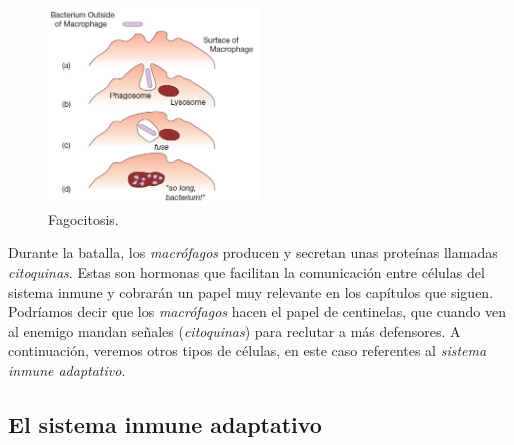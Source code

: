 \begin{figure}[t]
	\centering
	\includegraphics[width=0.5\textwidth]{1_macrofago}
	\caption{Fagocitosis.}
	\label{fig:macrofago}
\end{figure}


Durante la batalla, los \textit{macrófagos} producen y secretan unas proteínas llamadas \textit{citoquinas}.
Estas son hormonas que facilitan la comunicación entre células del sistema inmune y cobrarán un papel muy relevante en los capítulos que siguen.
Podríamos decir que los \textit{macrófagos} hacen el papel de centinelas, que cuando ven al enemigo mandan señales (\textit{citoquinas}) para reclutar a más defensores. A continuación, veremos otros tipos de células, en este caso referentes al \textit{sistema inmune adaptativo}.

\subsection{El sistema inmune adaptativo}

